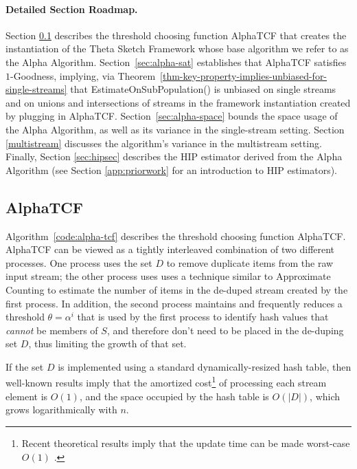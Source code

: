 \documentclass{article}
\newcommand{\edit}[1]{{#1}}
\begin{document}
\paragraph{Detailed Section Roadmap.} Section \ref{sec:alpha-tcf} describes the 
threshold choosing function AlphaTCF that creates the instantiation
of the Theta Sketch Framework whose base algorithm we refer to as the Alpha Algorithm.
Section~\ref{sec:alpha-sat} establishes that AlphaTCF satisfies $1$-Goodness, implying, via 
Theorem~\ref{thm-key-property-implies-unbiased-for-single-streams}
that EstimateOnSubPopulation() is unbiased on single streams and on unions and intersections of streams in the framework
instantiation created by plugging in AlphaTCF.
 Section~\ref{sec:alpha-space} bounds the space usage of the Alpha Algorithm, as well as its variance in
 the single-stream setting. Section \ref{multistream} discusses
the algorithm's variance in the multistream setting. Finally, 
Section \ref{sec:hipsec} describes the HIP estimator derived from the Alpha Algorithm (see Section \ref{app:priorwork} for an introduction to HIP estimators).


\label{app:alpha}

\subsection{AlphaTCF}\label{sec:alpha-tcf}

Algorithm~\ref{code:alpha-tcf} describes the threshold choosing function AlphaTCF. AlphaTCF can be
viewed as a tightly interleaved combination of two different processes. One process uses the set $D$ to remove
duplicate items from the raw input stream; the other process uses \edit{uses a technique similar to} Approximate Counting \cite{morris1978counting}
to estimate the number of items in the de-duped stream created by the first process. In addition, the second
process maintains and frequently reduces a threshold $\theta = \alpha^i$ that is used by the first process to identify 
hash values that {\em cannot} be members of $S$, and therefore don't need to be placed in the de-duping set $D$,
thus limiting the growth of that set.

If the set $D$ is implemented using a standard dynamically-resized
hash table, then well-known results imply that the amortized cost\footnote{Recent
theoretical results imply that the update time can be made worst-case $O(1)$ \cite{deamortizedcuckoo1, deamortizedcuckoo2}.}
of processing each stream element is $O(1)$, and the space occupied by
the hash table is $O(|D|)$, which grows logarithmically with $n$.
\end{document}

